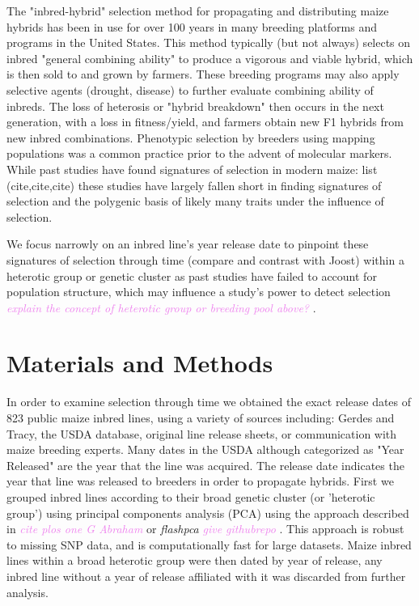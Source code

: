 \documentclass[9pt,twocolumn,twoside]{gsajnl}
\newcommand{\kc}[1]{\textcolor{violet}{ \emph{ #1}} }
\begin{document}
The "inbred-hybrid" selection method for propagating and distributing maize hybrids has been in use for over 100 years in many breeding platforms and programs in the United States. 
This method typically (but not always) selects on inbred "general combining ability" to produce a vigorous and viable hybrid, which is then sold to and grown by farmers. 
These breeding programs may also apply selective agents (drought, disease) to further evaluate combining ability of inbreds.
The loss of heterosis or "hybrid breakdown" then occurs in the next generation, with a loss in fitness/yield, and farmers obtain new F1 hybrids from new inbred combinations.
Phenotypic selection by breeders using mapping populations was a common practice prior to the advent of molecular markers. 
While past studies have found signatures of selection in modern maize: list (cite,cite,cite) these studies have largely fallen short in finding signatures of selection and the polygenic basis of likely many traits under the influence of selection. 


We focus narrowly on an inbred line's year release date to pinpoint these signatures of selection through time (compare and contrast with Joost) within a heterotic group or genetic cluster as past studies have failed to account for population structure, which may influence a study's power to detect selection \kc{explain the concept of heterotic group or breeding pool above?}. 



\section*{Materials and Methods}

In order to examine selection through time we obtained the exact release dates of 823 public maize inbred lines, using a variety of sources including: Gerdes and Tracy, the USDA database, original line release sheets, or communication with maize breeding experts. Many dates in the USDA although categorized as "Year Released" are the year that the line was acquired. 
The release date indicates the year that line was released to breeders in order to propagate hybrids.
First we grouped inbred lines according to their broad genetic cluster (or 'heterotic group') using principal components analysis (PCA) using the approach described in  \kc{cite plos one G Abraham} or \textit{flashpca} \kc{give githubrepo}. 
This approach is robust to missing SNP data, and is computationally fast for large datasets.  
Maize inbred lines within a broad heterotic group were then dated by year of release, any inbred line without a year of release affiliated with it was discarded from further analysis.
\end{document}
